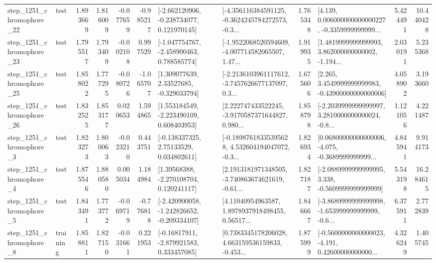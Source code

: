 \begin{tabular}{llrrrrllrlrr}
 step\_1251\_chromophore\_22 &      test &      1.893669 &    1.816009 &     -0.077659 & -0.985217 &   [-2.662120906, -0.238734077, 0.121970145] &  [-4.356116384591125, -0.3624245784272573, -0.3... &       1.765348 &  [4.139, 0.006000000000000227, -0.3359999999999... &            5.424491 &         10.440428 \\
 step\_1251\_chromophore\_23 &      test &      1.795517 &    1.793409 &     -0.002108 &  0.997529 &   [-1.047754767, -2.458900463, 0.788585774] &  [-1.9522068520594609, -4.007714582065507, 1.47... &       1.919935 &  [1.4819999999999993, 3.862000000000002, -1.194... &            2.030191 &          5.235368 \\
 step\_1251\_chromophore\_25 &      test &      1.858022 &    1.777295 &     -0.080726 & -1.065707 &     [1.309077639, 2.33527685, -0.329033794] &  [-2.2136103961117612, -3.7457626677137097, 0.3... &       1.675606 &  [2.265, 3.4549999999999983, -0.43900000000000006] &            4.058902 &          3.193660 \\
 step\_1251\_chromophore\_26 &      test &      1.832525 &    1.853177 &      0.020653 &  1.594865 &    [1.553184549, -2.223490109, 0.608403953] &  [2.222747433522245, -3.9170587371644827, 0.980... &       1.858798 &  [-2.2039999999999997, 3.2810000000000024, -0.8... &            1.121056 &          4.221487 \\
  step\_1251\_chromophore\_3 &      test &      1.823273 &    1.800063 &     -0.023210 &  0.443751 &     [-0.138337325, 2.75133529, 0.034802611] &  [-0.18987618335395628, 4.532604194047072, -0.3... &       1.826934 &  [0.06800000000000006, -4.075, -0.3689999999999... &            4.845941 &          9.914173 \\
  step\_1251\_chromophore\_4 &      test &      1.875546 &    1.880580 &      0.005034 &  1.184984 &     [1.39568388, -2.270108704, 0.120241117] &  [2.1913181971348505, -3.740863674621619, -0.61... &       1.827187 &  [-2.0889999999999995, 3.338, -0.5609999999999999] &            5.543198 &         16.284615 \\
  step\_1251\_chromophore\_5 &      test &      1.843491 &    1.773772 &     -0.069719 & -0.776818 &  [-2.420900058, -1.242826652, -0.209334107] &  [4.11040954963587, 1.8978937918498455, 0.56517... &       1.846667 &  [-3.8689999999999998, -1.653999999999999, -0.6... &            6.375911 &          2.772839 \\
  step\_1251\_chromophore\_8 &  training &      1.858811 &    1.827150 &     -0.031661 &  0.221953 &    [-0.16817911, -2.879921583, 0.333457085] &  [0.7383345178206028, 4.663159536159833, -0.453... &       1.875999 &  [-0.5600000000000023, -4.191, 0.42600000000000... &            4.326249 &          1.405745 \\

\end{tabular}
